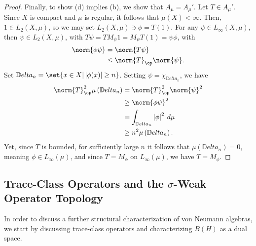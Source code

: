 \documentclass[10pt]{mypackage}
\begin{document}
\begin{proof}
  Finally, to show (d) implies (b), we show that $A_{\mu} = A_{\mu}'$. Let $T\in A_{\mu}'$. Since $X$ is compact and $\mu$ is regular, it follows that $\mu(X) < \infty$. Then, $1\in L_2\left( X,\mu \right)$, so we may set $L_2\left( X,\mu \right)\ni \phi = T(1)$. For any $\psi\in L_{\infty}\left( X,\mu \right)$, then $\psi\in L_2\left( X,\mu \right)$, with $T\psi = TM_{\psi}1 = M_{\psi}T(1) = \psi\phi$, with
  \begin{align*}
    \norm{\phi\psi} &= \norm{T\psi}\\
                    &\leq \norm{T}_{\op}\norm{\psi}.
  \end{align*}
  Set $\mathbb{D}elta_n = \set{x\in X | \left\vert \phi(x) \right\vert \geq n}$. Setting $\psi = \chi_{\mathbb{D}elta_n}$, we have
  \begin{align*}
    \norm{T}_{\op}^2\mu\left( \mathbb{D}elta_n \right) &= \norm{T}_{\op}^2\norm{\psi}^2\\
                                               &\geq \norm{\phi\psi}^2\\
                                               &= \int_{\mathbb{D}elta_n}^{} \left\vert \phi \right\vert^2\:d\mu\\
                                               &\geq n^2\mu\left( \mathbb{D}elta_n \right).
  \end{align*}
  Yet, since $T$ is bounded, for sufficiently large $n$ it follows that $\mu\left( \mathbb{D}elta_n \right) = 0$, meaning $\phi\in L_{\infty}\left( \mu \right)$, and since $T = M_{\phi}$ on $L_{\infty}(\mu)$, we have $T = M_{\phi}$.
\end{proof}
\subsection{Trace-Class Operators and the $\sigma$-Weak Operator Topology}%
In order to discuss a further structural characterization of von Neumann algebras, we start by discussing trace-class operators and characterizing $B(H)$ as a dual space.
\end{document}
